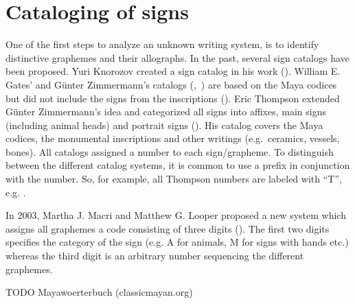 \documentclass[../main.tex]{subfiles}
\begin{document}
\section{Cataloging of signs}
One of the first steps to analyze an unknown writing system, is to identify distinctive graphemes 
and their allographs. 
In the past, several sign catalogs have been proposed.
Yuri Knorozov created a sign catalog in his work (\cite[109\psq]{knorozov1967}).
William E. Gates' and G\"unter Zimmermann's catalogs (\cite{gates1931},~\cite{zimmermann1956}) are 
based on the Maya codices but did not include the signs from the inscriptions 
(\cite[4]{thompson1962catalog}). 
Eric Thompson extended G\"unter Zimmermann's idea and categorized all signs into affixes, main signs 
(including animal heads) and portrait signs (\cite[4]{thompson1962catalog}).
His catalog covers the Maya codices, the monumental inscriptions and other writings 
(e.g.\ ceramics, vessels, bones).
All catalogs assigned a number to each sign/grapheme.
To distinguish between the different catalog systems, it is common to use a prefix in 
conjunction with the number.
So, for example, all Thompson numbers are labeled with ``T'', e.g. .

In 2003, Martha J. Macri and Matthew G. Looper proposed a new system which assigns all graphemes
a code consisting of three digits (\cite[21,25]{macrilooper2003}).
The first two digits specifies the category of the sign 
(e.g. A for animals, M for signs with hands etc.) whereas the third digit is an arbitrary number
sequencing the different graphemes.

TODO Mayawoerterbuch (classicmayan.org)
\end{document}
